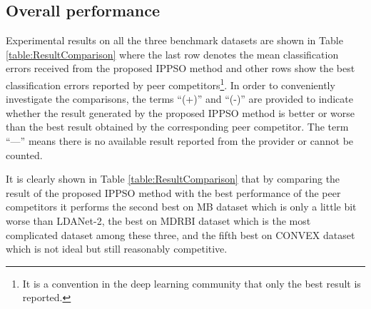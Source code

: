 \documentclass[conference]{IEEEtran}
\begin{document}
\subsection{Overall performance}\label{sec:Performance}

Experimental results on all the three benchmark datasets are shown in Table \ref{table:ResultComparison} where the last row denotes the mean classification errors received from the proposed IPPSO method and other rows show the best classification errors reported by peer competitors\footnote{It is a convention in the deep learning community that only the best result is reported.}. In order to conveniently investigate the comparisons, the terms “(+)” and “(-)” are provided to indicate whether the result generated by the proposed IPPSO method is better or worse than the best result obtained by the corresponding peer competitor. The term “—” means there is no available result reported from the provider or cannot be counted.

It is clearly shown in Table \ref{table:ResultComparison} that by comparing the result of the proposed IPPSO method with the best performance of the peer competitors it performs the second best on MB dataset which is only a little bit worse than LDANet-2, the best on MDRBI dataset which is the most complicated dataset among these three, and the fifth best on CONVEX dataset which is not ideal but still reasonably competitive. 
\end{document}
